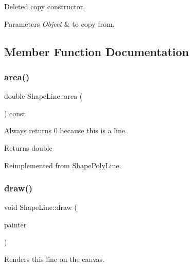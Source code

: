 Deleted copy constructor. 


\begin{DoxyParams}{Parameters}
{\em Object} & to copy from. \\
\hline
\end{DoxyParams}


\subsection{Member Function Documentation}
\mbox{\label{class_shape_line_a6f33bdd78706ad73e570b4ba53bbc00b}} 
\subsubsection{\texorpdfstring{area()}{area()}}
{\footnotesize\ttfamily double Shape\+Line\+::area (\begin{DoxyParamCaption}{ }\end{DoxyParamCaption}) const\hspace{0.3cm}{\ttfamily [virtual]}}



Always returns 0 because this is a line. 

\begin{DoxyReturn}{Returns}
double 
\end{DoxyReturn}


Reimplemented from \mbox{\hyperlink{class_shape_poly_line_ace9d3c1eefec00364034dc420262c91e}{Shape\+Poly\+Line}}.

\mbox{\label{class_shape_line_a8b4dbfe05387934a0f9c4a053a798239}} 
\subsubsection{\texorpdfstring{draw()}{draw()}}
{\footnotesize\ttfamily void Shape\+Line\+::draw (\begin{DoxyParamCaption}\item[{Q\+Painter \&}]{painter }\end{DoxyParamCaption})\hspace{0.3cm}{\ttfamily [virtual]}}



Renders this line on the canvas. 


